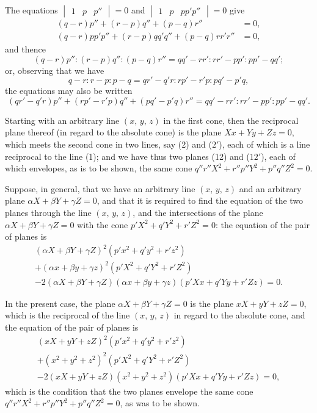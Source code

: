 \documentclass[11pt,a4paper]{book}
\begin{document}
The equations $\begin{vmatrix}1 & p & p''\end{vmatrix} = 0$ and $\begin{vmatrix}1 & p & pp'p''\end{vmatrix} = 0$ give
\begin{align*}
(q-r)p'' + (r-p)q'' + (p-q)r'' &= 0,\\
(q-r)pp'p'' + (r-p)qq'q'' + (p-q)rr'r'' &= 0,
\end{align*}
and thence
\[
(q-r)p'' : (r-p)q'' : (p-q)r'' = qq' - rr' : rr' - pp' : pp' - qq';
\]
or, observing that we have
\[
q-r : r-p : p-q = qr' - q'r : rp' - r'p : pq' - p'q,
\]
the equations may also be written
\[
(qr' - q'r)p'' + (rp' - r'p)q'' + (pq' - p'q)r'' = qq' - rr' : rr' - pp' : pp' - qq'.
\]

Starting with an arbitrary line $(x,\, y,\, z)$ in the first cone, then the reciprocal plane thereof (in regard to the absolute cone) is the plane $Xx + Yy + Zz = 0$, which meets the second cone in two lines, say (2) and ($2'$), each of which is a line reciprocal to the line (1); and we have thus two planes (12) and ($12'$), each of which envelopes, as is to be shown, the same cone $q''r''X^{2} + r''p''Y^{2} + p''q''Z^{2} = 0$.

Suppose, in general, that we have an arbitrary line $(x,\, y,\, z)$ and an arbitrary plane $\alpha X + \beta Y + \gamma Z = 0$, and that it is required to find the equation of the two planes through the line $(x,\, y,\, z)$, and the intersections of the plane $\alpha X + \beta Y + \gamma Z = 0$ with the cone $p'X^{2} + q'Y^{2} + r'Z^{2} = 0$: the equation of the pair of planes is
\begin{multline*}
(\alpha X + \beta Y + \gamma Z)^{2}(p'x^{2} + q'y^{2} + r'z^{2}) \\
+ (\alpha x + \beta y + \gamma z)^{2}(p'X^{2} + q'Y^{2} + r'Z^{2}) \\
- 2(\alpha X + \beta Y + \gamma Z)(\alpha x + \beta y + \gamma z)(p'Xx + q'Yy + r'Zz) = 0.
\end{multline*}

In the present case, the plane $\alpha X + \beta Y + \gamma Z = 0$ is the plane $xX + yY + zZ = 0$, which is the reciprocal of the line $(x,\, y,\, z)$ in regard to the absolute cone, and the equation of the pair of planes is
\begin{multline*}
(xX + yY + zZ)^{2}(p'x^{2} + q'y^{2} + r'z^{2}) \\
+ (x^{2} + y^{2} + z^{2})^{2}(p'X^{2} + q'Y^{2} + r'Z^{2}) \\
- 2(xX + yY + zZ)(x^{2} + y^{2} + z^{2})(p'Xx + q'Yy + r'Zz) = 0,
\end{multline*}
which is the condition that the two planes envelope the same cone $q''r''X^{2} + r''p''Y^{2} + p''q''Z^{2} = 0$, as was to be shown.
\end{document}
